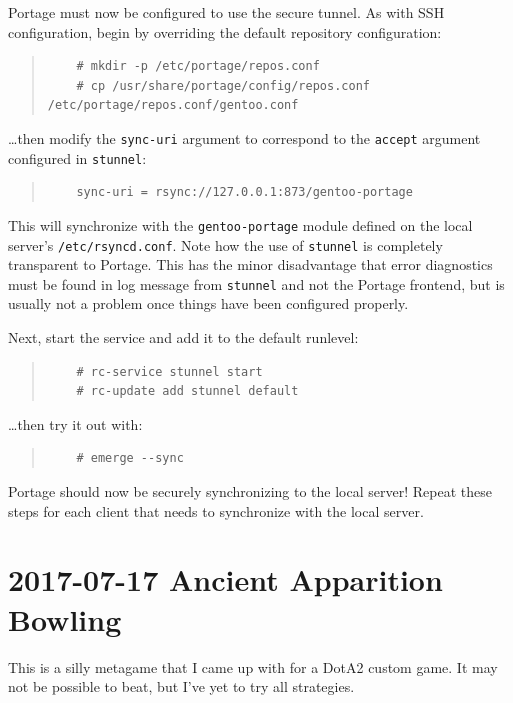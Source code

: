 \documentclass{article}
\begin{document}
Portage must now be configured to use the secure tunnel.  As with SSH configuration, begin by overriding the default repository configuration:
\begin{quote}
\begin{verbatim}
	# mkdir -p /etc/portage/repos.conf
	# cp /usr/share/portage/config/repos.conf /etc/portage/repos.conf/gentoo.conf
\end{verbatim}
\end{quote}
\ldots then modify the \texttt{sync-uri} argument to correspond to the \texttt{accept} argument configured in \texttt{stunnel}:
\begin{quote}
\begin{verbatim}
	sync-uri = rsync://127.0.0.1:873/gentoo-portage
\end{verbatim}
\end{quote}
This will synchronize with the \texttt{gentoo-portage} module defined on the local server's \texttt{/etc/rsyncd.conf}.  Note how the use of \texttt{stunnel} is completely transparent to Portage.  This has the minor disadvantage that error diagnostics must be found in log message from \texttt{stunnel} and not the Portage frontend, but is usually not a problem once things have been configured properly.

Next, start the service and add it to the default runlevel:
\begin{quote}
\begin{verbatim}
	# rc-service stunnel start
	# rc-update add stunnel default
\end{verbatim}
\end{quote}
\ldots then try it out with:
\begin{quote}
\begin{verbatim}
	# emerge --sync
\end{verbatim}
\end{quote}
Portage should now be securely synchronizing to the local server!  Repeat these steps for each client that needs to synchronize with the local server.


\section{2017-07-17 Ancient Apparition Bowling}
This is a silly metagame that I came up with for a DotA2 custom game.  It may not be possible to beat, but I've yet to try all strategies.
\end{document}
